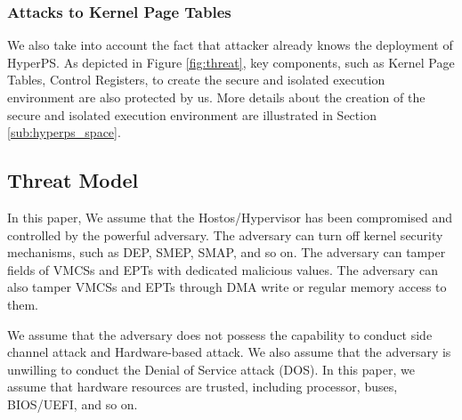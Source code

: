 \subsubsection{Attacks to Kernel Page Tables}
We also take into account the fact that attacker already knows the deployment of HyperPS. As depicted in Figure \ref{fig:threat}, key components, such as Kernel Page Tables, Control Registers, to create the secure and isolated execution environment are also protected by us. More details about the creation of the secure and isolated execution environment are illustrated in Section \ref{sub:hyperps_space}. 
 


\subsection{Threat Model} \label{sub:threatmodel}
In this paper, 
We assume that the Hostos/Hypervisor has been compromised and controlled by the powerful adversary. The adversary can turn off kernel security mechanisms, such as DEP, SMEP, SMAP, and so on. The adversary can tamper fields of VMCSs and EPTs with dedicated malicious values. The adversary can also tamper VMCSs and EPTs through DMA write or regular memory access to them.  

We assume that the adversary does not possess the capability to conduct side channel attack and Hardware-based attack. We also assume that the adversary is unwilling to conduct the Denial of Service attack (DOS). In this paper, we assume that hardware resources are trusted, including processor, buses, BIOS/UEFI, and so on. 





















